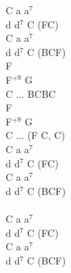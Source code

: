 \documentclass[a5paper, 10pt]{book}
\begin{document}
\begin{minipage}[t]{0.3\textwidth}
C a a$^7$\\
d d$^7$ C (FC)\\
C a a$^7$\\
d d$^7$ C (BCF)\\

F\\
F$^{+9}$ G\\
C ... BCBC\\
F\\
F$^{+9}$ G\\
C ... (F C, C)\\

C a a$^7$\\
d d$^7$ C (FC)\\
C a a$^7$\\
d d$^7$ C (BCF)\\

~\\

C a a$^7$\\
d d$^7$ C (FC)\\
C a a$^7$\\
d d$^7$ C (BCF)\\

~\\
\end{minipage}

\newpage
\end{document}
